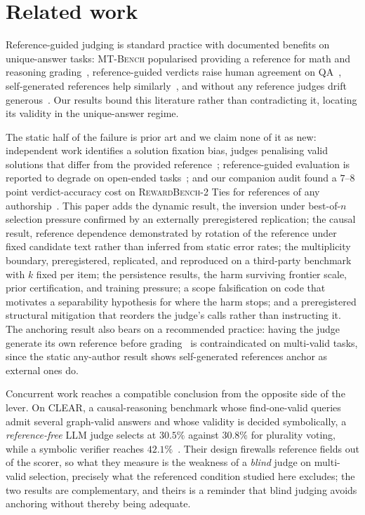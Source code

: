 \documentclass[11pt]{article}
\begin{document}
\section{Related work}

Reference-guided judging is standard practice with documented benefits on unique-answer tasks: \textsc{MT-Bench} popularised providing a reference for math and reasoning grading~\cite{zheng2023judging}, reference-guided verdicts raise human agreement on QA~\cite{refguided2024}, self-generated references help similarly~\cite{dobefore2025}, and without any reference judges drift generous~\cite{generous2026}.
Our results bound this literature rather than contradicting it, locating its validity in the unique-answer regime.

The static half of the failure is prior art and we claim none of it as new: independent work identifies a solution fixation bias, judges penalising valid solutions that differ from the provided reference~\cite{fixation2025}; reference-guided evaluation is reported to degrade on open-ended tasks~\cite{judgingref2026}; and our companion audit found a $7$--$8$ point verdict-accuracy cost on \textsc{RewardBench-2} Ties for references of any authorship~\cite{companionA}.
This paper adds the dynamic result, the inversion under best-of-$n$ selection pressure confirmed by an externally preregistered replication; the causal result, reference dependence demonstrated by rotation of the reference under fixed candidate text rather than inferred from static error rates; the multiplicity boundary, preregistered, replicated, and reproduced on a third-party benchmark with $k$ fixed per item; the persistence results, the harm surviving frontier scale, prior certification, and training pressure; a scope falsification on code that motivates a separability hypothesis for where the harm stops; and a preregistered structural mitigation that reorders the judge's calls rather than instructing it.
The anchoring result also bears on a recommended practice: having the judge generate its own reference before grading~\cite{dobefore2025} is contraindicated on multi-valid tasks, since the static any-author result shows self-generated references anchor as external ones do.

Concurrent work reaches a compatible conclusion from the opposite side of the lever.
On \textsc{CLEAR}, a causal-reasoning benchmark whose find-one-valid queries admit several graph-valid answers and whose validity is decided symbolically, a \emph{reference-free} LLM judge selects at $30.5\%$ against $30.8\%$ for plurality voting, while a symbolic verifier reaches $42.1\%$~\cite{calver2026}.
Their design firewalls reference fields out of the scorer, so what they measure is the weakness of a \emph{blind} judge on multi-valid selection, precisely what the referenced condition studied here excludes; the two results are complementary, and theirs is a reminder that blind judging avoids anchoring without thereby being adequate.
\end{document}
